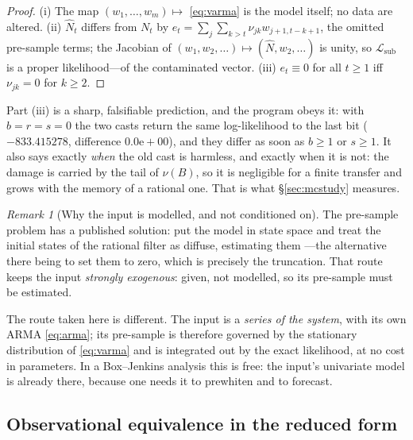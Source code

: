 \documentclass[11pt,a4paper]{article}
\theoremstyle{plain}
\theoremstyle{remark}
\newtheorem{remark}[proposition]{Remark}
\begin{document}
\begin{proof}
(i) The map $(w_1,\dots,w_m)\mapsto$ \eqref{eq:varma} is the model itself; no data
are altered. (ii) $\hat N_t$ differs from $N_t$ by
$e_t=\sum_j\sum_{k>t}\nu_{jk}w_{j+1,t-k+1}$, the omitted pre-sample terms; the
Jacobian of $(w_1,w_2,\dots)\mapsto(\hat N,w_2,\dots)$ is unity, so
$\mathcal{L}_{\mathrm{sub}}$ is a proper likelihood---of the contaminated vector.
(iii) $e_t\equiv0$ for all $t\ge1$ iff $\nu_{jk}=0$ for $k\ge2$.
\end{proof}

Part (iii) is a sharp, falsifiable prediction, and the program obeys it: with
$b=r=s=0$ the two casts return the same log-likelihood to the last bit
($-833.415278$, difference $0.0\mathrm{e}{+}00$), and they differ as soon as $b\ge1$
or $s\ge1$. It also says exactly \emph{when} the old cast is harmless, and exactly
when it is not: the damage is carried by the tail of $\nu(B)$, so it is negligible
for a finite transfer and grows with the memory of a rational one. That is what
\S\ref{sec:mcstudy} measures.

\begin{remark}[Why the input is modelled, and not conditioned on]
\label{rem:endog}
The pre-sample problem has a published solution: put the model in state space and
treat the initial states of the rational filter as diffuse, estimating them
\cite[\S3.2.1, field \texttt{ser.inc}]{gomez2019}---the alternative there being to
set them to zero, which is precisely the truncation. That route keeps the input
\emph{strongly exogenous}: given, not modelled, so its pre-sample must be estimated.

The route taken here is different. The input is a \emph{series of the system}, with
its own ARMA \eqref{eq:arma}; its pre-sample is therefore governed by the stationary
distribution of \eqref{eq:varma} and is integrated out by the exact likelihood, at no
cost in parameters. In a Box--Jenkins analysis this is free: the input's univariate
model is already there, because one needs it to prewhiten and to forecast.
\end{remark}

\subsection{Observational equivalence in the reduced form}
\label{sec:ident-theory}
\end{document}
